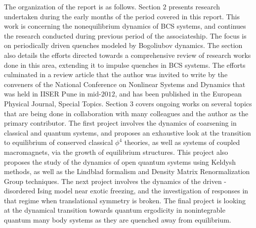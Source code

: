 \documentclass[a4paper,10pt]{report}
\begin{document}
The organization of the report is as follows. Section $2$ presents research undertaken during the early months of the period covered in this report. This work is concerning the nonequilibrium dynamics of BCS systems, and continues the research conducted during previous period of the associateship. The focus is on periodically driven quenches modeled by Bogoliubov dynamics. The section also details the efforts directed towards a comprehensive review of research works done in this area, extending it to impulse quenches in BCS systems. The efforts culminated in a review article that the author was invited to write by the conveners of the National Conference on Nonlinear Systems and Dynamics that was held in IISER Pune in mid-$2012$, and has been published in the European Physical Journal, Special Topics. Section $3$ covers ongoing works on several topics that are being done in collaboration with many colleagues and the author as the primary contributor. The first project involves the dynamics of coarsening in classical and quantum systems, and proposes an exhaustive look at the transition to equilibrium of conserved classical $\phi^4$ theories, as well as systems of coupled macromagnets, via the growth of equilibrium structures. This project also proposes the study of the dynamics of open quantum systems using Keldysh methods, as well as the Lindblad formalism and Density Matrix Renormalization Group techniques. The next project involves the dynamics of the driven - disordered Ising model near exotic freezing, and the investigation of responses in that regime when translational symmetry is broken. The final project is looking at the dynamical transition towards quantum ergodicity in nonintegrable quantum many body systems as they are quenched away from equilibrium. 
\end{document}
